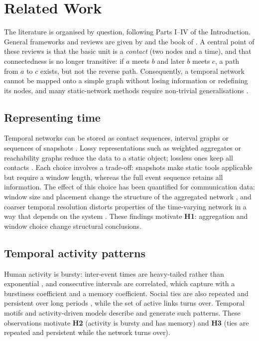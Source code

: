 \section{Related Work}
\label{sec:related}
The literature is organised by question, following Parts I--IV of the Introduction.
General frameworks and reviews are given by
\citet{holme2012temporal,holme2015modern} and the book of \citet{masuda2016guide}.
A central point of these reviews is that the basic unit is a \emph{contact}
(two nodes and a time), and that connectedness is no longer transitive: if $a$ meets
$b$ and later $b$ meets $c$, a path from $a$ to $c$ exists, but not the reverse path.
Consequently, a temporal network cannot be mapped onto a simple graph without losing
information or redefining its nodes, and many static-network methods require non-trivial
generalisations \citep{holme2015modern}.

\subsection{Representing time}
\label{sec:rw-representation}
Temporal networks can be stored as contact sequences, interval graphs or sequences of
snapshots \citep{holme2012temporal}. Lossy representations such as weighted aggregates or reachability graphs reduce the
data to a static object; lossless ones keep all contacts \citep{holme2015modern}.
Each choice involves a trade-off: snapshots
make static tools applicable but require a window length, whereas the full event
sequence retains all information. The effect of this choice has been quantified for
communication data: window size and placement change the structure of the aggregated
network \citep{krings2012effects}, and coarser temporal resolution distorts
properties of the time-varying network in a way that depends on the system
\citep{ribeiro2013quantifying}. These findings motivate \textbf{H1}: aggregation and window
choice change structural conclusions.

\subsection{Temporal activity patterns}
\label{sec:rw-activity}
Human activity is bursty: inter-event times are heavy-tailed rather than exponential
\citep{barabasi2005origin}, and consecutive intervals are correlated, which
\citet{goh2008burstiness} capture with a burstiness coefficient and a memory
coefficient. Social ties are also repeated and persistent over long periods
\citep{saramaki2014persistence}, while the set of active links turns over. Temporal motifs
\citep{kovanen2011temporal,paranjape2017motifs} and activity-driven models
\citep{perra2012activity} describe and generate such patterns. These observations
motivate \textbf{H2} (activity is bursty and has memory) and \textbf{H3} (ties are repeated and
persistent while the network turns over).

